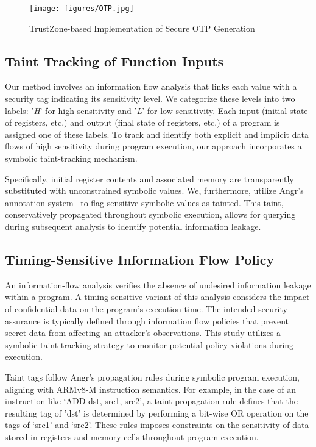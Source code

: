 \begin{figure*}
  \centering
  \texttt{[image: figures/OTP.jpg]}
  \caption{TrustZone-based Implementation of Secure OTP Generation}
  \label{fig:OTP}
\end{figure*}

\subsection{Taint Tracking of Function Inputs}

Our method involves an information flow analysis that links each value with
a security tag indicating its sensitivity level. We categorize
these levels into two labels: '\textit{H}' for high sensitivity and
'\textit{L}' for low sensitivity. Each input (initial state of registers,
etc.) and output (final state of registers, etc.) of a program is assigned
one of these labels. To track and identify both explicit and
implicit data flows of high sensitivity during program execution, our
approach incorporates a symbolic taint-tracking mechanism.

Specifically, initial register contents and associated memory are
transparently substituted with unconstrained symbolic values. We,
furthermore, utilize Angr’s annotation system~\cite{angr} to flag 
sensitive symbolic values as tainted. This taint, conservatively propagated
throughout symbolic execution, allows for querying during
subsequent analysis to identify potential information leakage. 

\subsection{Timing-Sensitive Information Flow Policy}

An information-flow analysis verifies the absence of undesired information
leakage within a program. A timing-sensitive variant of this analysis
considers the impact of confidential data on the program's execution time.
The intended security assurance is typically defined through information
flow policies that prevent secret data from affecting an attacker's
observations. This study utilizes a symbolic taint-tracking strategy to
monitor potential policy violations during execution.

Taint tags follow Angr's propagation rules during symbolic
program execution, aligning with ARMv8-M instruction semantics. For
example, in the case of an instruction like ‘ADD dst, src1, src2’, a taint
propagation rule defines that the resulting tag of 'dst' is
determined by performing a bit-wise OR operation on the tags of ‘src1’ and
‘src2’. These rules imposes constraints on the sensitivity of
data stored in registers and memory cells throughout program execution. 

